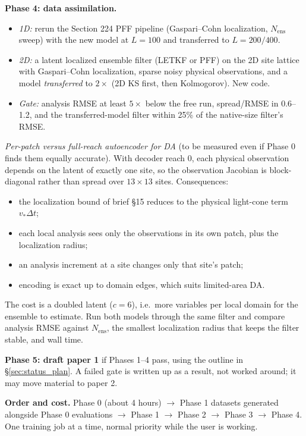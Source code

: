 \documentclass[11pt]{article}
\begin{document}
\textbf{Phase 4: data assimilation.}
\begin{itemize}[leftmargin=*]
\item \emph{1D:} rerun the Section 224 PFF pipeline (Gaspari--Cohn
  localization, $N_{\mathrm{ens}}$ sweep) with the new model at $L{=}100$
  and transferred to $L{=}200/400$.
\item \emph{2D:} a latent localized ensemble filter (LETKF or PFF) on the
  2D site lattice with Gaspari--Cohn localization, sparse noisy physical
  observations, and a model \emph{transferred} to $2\times$ (2D KS first,
  then Kolmogorov). New code.
\item \emph{Gate:} analysis RMSE at least $5\times$ below the free run,
  spread/RMSE in 0.6--1.2, and the transferred-model filter within 25\%
  of the native-size filter's RMSE.
\end{itemize}
\emph{Per-patch versus full-reach autoencoder for DA} (to be measured
even if Phase 0 finds them equally accurate). With decoder reach 0, each
physical observation depends on the latent of exactly one site, so the
observation Jacobian is block-diagonal rather than spread over
$13\times13$ sites. Consequences:
\begin{itemize}[leftmargin=*]
\item the localization bound of brief \S15 reduces to the physical
  light-cone term $v_*\Delta t$;
\item each local analysis sees only the observations in its own patch,
  plus the localization radius;
\item an analysis increment at a site changes only that site's patch;
\item encoding is exact up to domain edges, which suits limited-area
  DA.
\end{itemize}
The cost is a doubled latent ($c{=}6$), i.e.\ more variables per local
domain for the ensemble to estimate. Run both models through the same
filter and compare analysis RMSE against $N_{\mathrm{ens}}$, the
smallest localization radius that keeps the filter stable, and wall
time.

\textbf{Phase 5: draft paper 1} if Phases 1--4 pass, using the outline in
\S\ref{sec:status_plan}. A failed gate is written up as a result, not
worked around; it may move material to paper 2.

\textbf{Order and cost.} Phase 0 (about 4 hours) $\to$ Phase 1 datasets
generated alongside Phase 0 evaluations $\to$ Phase 1 $\to$ Phase 2 $\to$
Phase 3 $\to$ Phase 4. One training job at a time, normal priority while
the user is working.
\end{document}
